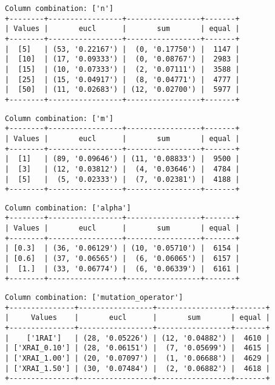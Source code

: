 \documentclass{article}
\begin{document}
\begin{verbatim}
Column combination: ['n']
+--------+-----------------+-----------------+-------+
| Values |       eucl      |       sum       | equal |
+--------+-----------------+-----------------+-------+
|  [5]   | (53, '0.22167') |  (0, '0.17750') |  1147 |
|  [10]  | (17, '0.09333') |  (0, '0.08767') |  2983 |
|  [15]  | (10, '0.07333') |  (2, '0.07111') |  3588 |
|  [25]  | (15, '0.04917') |  (8, '0.04771') |  4777 |
|  [50]  | (11, '0.02683') | (12, '0.02700') |  5977 |
+--------+-----------------+-----------------+-------+
\end{verbatim}

\begin{verbatim}
Column combination: ['m']
+--------+-----------------+-----------------+-------+
| Values |       eucl      |       sum       | equal |
+--------+-----------------+-----------------+-------+
|  [1]   | (89, '0.09646') | (11, '0.08833') |  9500 |
|  [3]   | (12, '0.03812') |  (4, '0.03646') |  4784 |
|  [5]   |  (5, '0.02333') |  (7, '0.02381') |  4188 |
+--------+-----------------+-----------------+-------+
\end{verbatim}

\begin{verbatim}
Column combination: ['alpha']
+--------+-----------------+-----------------+-------+
| Values |       eucl      |       sum       | equal |
+--------+-----------------+-----------------+-------+
| [0.3]  | (36, '0.06129') | (10, '0.05710') |  6154 |
| [0.6]  | (37, '0.06565') |  (6, '0.06065') |  6157 |
|  [1.]  | (33, '0.06774') |  (6, '0.06339') |  6161 |
+--------+-----------------+-----------------+-------+
\end{verbatim}

\begin{verbatim}
Column combination: ['mutation_operator']
+---------------+-----------------+-----------------+-------+
|     Values    |       eucl      |       sum       | equal |
+---------------+-----------------+-----------------+-------+
|    ['1RAI']   | (28, '0.05226') | (12, '0.04882') |  4610 |
| ['XRAI_0.10'] | (28, '0.06151') |  (7, '0.05699') |  4615 |
| ['XRAI_1.00'] | (20, '0.07097') |  (1, '0.06688') |  4629 |
| ['XRAI_1.50'] | (30, '0.07484') |  (2, '0.06882') |  4618 |
+---------------+-----------------+-----------------+-------+
\end{verbatim}
\end{document}
